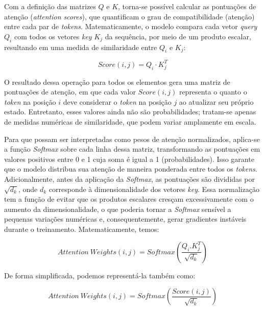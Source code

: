 Com a definição das matrizes $Q$ e $K$, torna-se possível calcular as pontuações de atenção (\textit{attention scores}), que quantificam o grau de compatibilidade (atenção) entre cada par de \textit{tokens}. Matematicamente, o modelo compara cada vetor \textit{query} $Q_i$ com todos os vetores \textit{key} $K_j$ da sequência, por meio de um produto escalar, resultando em uma medida de similaridade entre $Q_i$ e $K_j$:

\begin{equation}
    Score(i,j) = Q_i \cdot K^T_j
\end{equation}

O resultado dessa operação para todos os elementos gera uma matriz de pontuações de atenção, em que cada valor $Score(i,j)$ representa o quanto o \textit{token} na posição $i$ deve considerar o \textit{token} na posição $j$ ao atualizar seu próprio estado. Entretanto, esses valores ainda não são probabilidades; tratam-se apenas de medidas numéricas de similaridade, que podem variar amplamente em escala.

Para que possam ser interpretadas como pesos de atenção normalizados, aplica-se a função \textit{Softmax} sobre cada linha dessa matriz, transformando as pontuações em valores positivos entre 0 e 1 cuja soma é igual a 1 (probabilidades). Isso garante que o modelo distribua sua atenção de maneira ponderada entre todos os \textit{tokens}. Adicionalmente, antes da aplicação da \textit{Softmax}, as pontuações são divididas por $\sqrt{d_k}$, onde $d_k$ corresponde à dimensionalidade dos vetores \textit{key}. Essa normalização tem a função de evitar que os produtos escalares cresçam excessivamente com o aumento da dimensionalidade, o que poderia tornar a \textit{Softmax}  sensível a pequenas variações numéricas e, consequentemente, gerar gradientes instáveis durante o treinamento. Matematicamente, temos:

\begin{equation}
    Attention \: Weights(i,j) = Softmax (\frac{Q_i . K^T_j}{\sqrt{d_k}})
\end{equation}

\begin{center}
    De forma simplificada, podemos representá-la também como:
\end{center}

\begin{equation}
    Attention \: Weights(i,j) = Softmax (\frac{Score(i,j)}{\sqrt{d_k}})
\end{equation}

